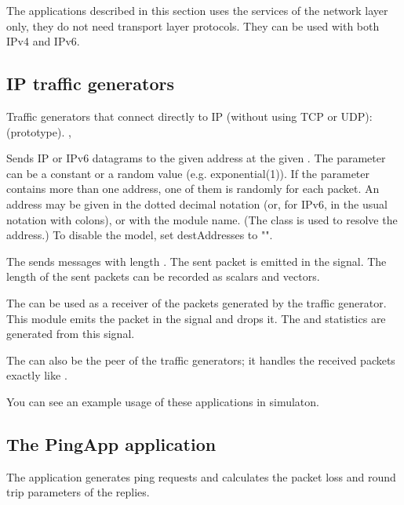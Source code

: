 The applications described in this section uses the services of the network
layer only, they do not need transport layer protocols.
They can be used with both IPv4 and IPv6.

\subsection{IP traffic generators}

Traffic generators that connect directly to IP (without using TCP or UDP):
 (prototype).
 ,

Sends IP or IPv6 datagrams to the given address at the given .
The  parameter can be a constant or a random value (e.g. exponential(1)).
If the  parameter contains more than one address, one
of them is randomly for each packet. An address may be given in the
dotted decimal notation (or, for IPv6, in the usual notation with colons),
or with the module name. (The  class is used to resolve
the address.) To disable the model, set destAddresses to "".

The  sends messages with length .
The sent packet is emitted in the  signal.
The length of the sent packets can be recorded as scalars and vectors.


The  can be used as a receiver of the packets
generated by the traffic generator. This module emits the packet
in the  signal and drops it. The 
and  statistics are generated from this signal.

The  can also be the peer of the traffic generators;
it handles the received packets exactly like .

You can see an example usage of these applications in 
simulaton.

\subsection{The PingApp application}

The  application
generates ping requests and calculates the packet loss and round trip
parameters of the replies.

